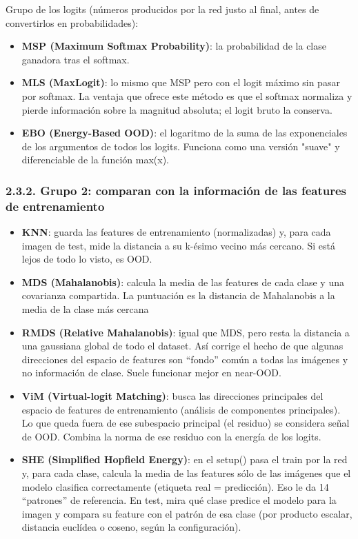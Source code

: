 Grupo de los logits (números producidos por la red justo al final, antes
de convertirlos en probabilidades):

\begin{itemize}
\item
  \textbf{MSP (Maximum Softmax Probability)}: la probabilidad de la
  clase ganadora tras el softmax.
\item
  \textbf{MLS (MaxLogit)}: lo mismo que MSP pero con el logit máximo sin
  pasar por softmax. La ventaja que ofrece este método es que el softmax
  normaliza y pierde información sobre la magnitud absoluta; el logit
  bruto la conserva.
\item
  \textbf{EBO (Energy-Based OOD)}: el logaritmo de la suma de las
  exponenciales de los argumentos de todos los logits. Funciona como una
  versión "suave" y diferenciable de la función max(x).
\end{itemize}

\subsubsection{2.3.2. Grupo 2: comparan con la información de las
features de
entrenamiento}\label{grupo-2-comparan-con-la-informaciuxf3n-de-las-features-de-entrenamiento}

\begin{itemize}
\item
  \textbf{KNN}: guarda las features de entrenamiento (normalizadas) y,
  para cada imagen de test, mide la distancia a su k-ésimo vecino más
  cercano. Si está lejos de todo lo visto, es OOD.
\item
  \textbf{MDS (Mahalanobis)}: calcula la media de las features de cada
  clase y una covarianza compartida. La puntuación es la distancia de
  Mahalanobis a la media de la clase más cercana
\item
  \textbf{RMDS (Relative Mahalanobis)}: igual que MDS, pero resta la
  distancia a una gaussiana global de todo el dataset. Así corrige el
  hecho de que algunas direcciones del espacio de features son ``fondo''
  común a todas las imágenes y no información de clase. Suele funcionar
  mejor en near-OOD.
\item
  \textbf{ViM (Virtual-logit Matching)}: busca las direcciones
  principales del espacio de features de entrenamiento (análisis de
  componentes principales). Lo que queda fuera de ese subespacio
  principal (el residuo) se considera señal de OOD. Combina la norma de
  ese residuo con la energía de los logits.
\item
  \textbf{SHE (Simplified Hopfield Energy)}: en el setup() pasa el train
  por la red y, para cada clase, calcula la media de las features sólo
  de las imágenes que el modelo clasifica correctamente (etiqueta real =
  predicción). Eso le da 14 ``patrones'' de referencia. En test, mira
  qué clase predice el modelo para la imagen y compara su feature con el
  patrón de esa clase (por producto escalar, distancia euclídea o
  coseno, según la configuración).
\end{itemize}

